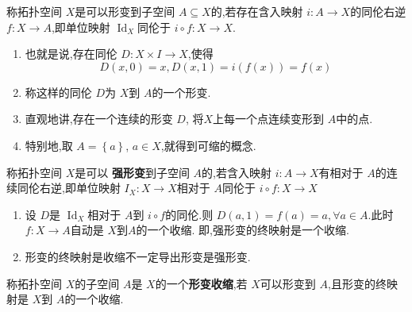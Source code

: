 \documentclass[../../几何与拓扑.tex]{subfiles}
\begin{document}
\begin{definition}
    称拓扑空间 \(  X  \)是可以形变到子空间 \(  A \subseteq X  \)的,若存在含入映射 \(  i: A \to X  \)的同伦右逆 \(  f: X \to A  \),即单位映射 \(  \operatorname{Id}_{X}  \)同伦于 \(  i \circ f: X \to X  \).       
\end{definition}

\begin{remark}
    \begin{enumerate}
        \item 也就是说,存在同伦 \(  D: X \times I \to X  \),使得 \[
        D\left( x,0 \right)= x, D\left( x,1 \right)= i\left( f\left( x \right)  \right)= f\left( x \right)    
        \] 
        \item 称这样的同伦 \(  D  \)为 \(  X  \)到 \(  A  \)的一个形变.
        \item 直观地讲,存在一个连续的形变 \(  D  \), 将\(  X  \)上每一个点连续变形到 \(  A  \)中的点.    
        \item 特别地,取 \(  A =  \left\{ a \right\}  \), \(  a \in X  \),就得到可缩的概念.
    \end{enumerate}
    
\end{remark}


\begin{definition}
    称拓扑空间 \(  X  \)是可以 \textbf{强形变}到子空间 \(  A  \)的,若含入映射 \(  i : A \to X  \)有相对于 \(  A  \)的连续同伦右逆,即单位映射 \(  I _{X}: X \to X  \)相对于 \(  A  \)同伦于 \(  i\circ f : X \to X  \)        
\end{definition}

\begin{remark}
\begin{enumerate}
    \item 设 \(  D  \)是 \(  \operatorname{Id}_{X}  \)相对于 \(  A  \)到 \(  i\circ f  \)的同伦.则 \(  D\left( a,1 \right)= f\left( a \right)= a ,\forall  a \in A    \).此时 \(  f: X \to A  \)自动是 \(  X  \)到\(  A  \)的一个收缩. 即,强形变的终映射是一个收缩.
    \item 形变的终映射是收缩不一定导出形变是强形变.
\end{enumerate}

\end{remark}


\begin{definition}
    称拓扑空间 \(  X  \)的子空间 \(  A  \)是 \(  X  \)的一个\textbf{形变收缩},若 \(  X  \)可以形变到 \(  A  \),且形变的终映射是 \(  X  \)到 \(  A  \)的一个收缩.       
\end{definition}
\end{document}
